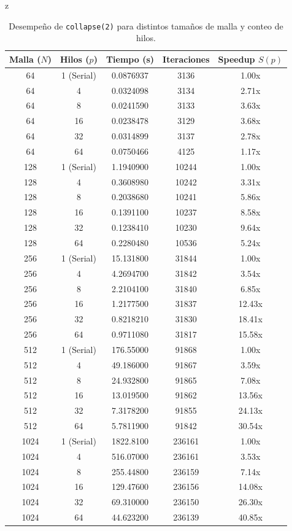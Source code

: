 z\documentclass[11pt,a4paper]{article}
\begin{document}
\begin{table}[H]
\centering
\renewcommand{\arraystretch}{1.2}
\small
\begin{tabular}{|c|c|c|c|c|}
\hline
\textbf{Malla ($N$)} & \textbf{Hilos ($p$)} & \textbf{Tiempo (s)} & \textbf{Iteraciones} & \textbf{Speedup $S(p)$} \\ \hline
64 & 1 (Serial) & 0.0876937 & 3136 & 1.00x \\ 
64 & 4 & 0.0324098 & 3134 & 2.71x \\ 
64 & 8 & 0.0241590 & 3133 & 3.63x \\ 
64 & 16 & 0.0238478 & 3129 & 3.68x \\ 
64 & 32 & 0.0314899 & 3137 & 2.78x \\ 
64 & 64 & 0.0750466 & 4125 & 1.17x \\ \hline
128 & 1 (Serial) & 1.1940900 & 10244 & 1.00x \\ 
128 & 4 & 0.3608980 & 10242 & 3.31x \\ 
128 & 8 & 0.2038680 & 10241 & 5.86x \\ 
128 & 16 & 0.1391100 & 10237 & 8.58x \\ 
128 & 32 & 0.1238410 & 10230 & 9.64x \\ 
128 & 64 & 0.2280480 & 10536 & 5.24x \\ \hline
256 & 1 (Serial) & 15.131800 & 31844 & 1.00x \\ 
256 & 4 & 4.2694700 & 31842 & 3.54x \\ 
256 & 8 & 2.2104100 & 31840 & 6.85x \\ 
256 & 16 & 1.2177500 & 31837 & 12.43x \\ 
256 & 32 & 0.8218210 & 31830 & 18.41x \\ 
256 & 64 & 0.9711080 & 31817 & 15.58x \\ \hline
512 & 1 (Serial) & 176.55000 & 91868 & 1.00x \\ 
512 & 4 & 49.186000 & 91867 & 3.59x \\ 
512 & 8 & 24.932800 & 91865 & 7.08x \\ 
512 & 16 & 13.019500 & 91862 & 13.56x \\ 
512 & 32 & 7.3178200 & 91855 & 24.13x \\ 
512 & 64 & 5.7811900 & 91842 & 30.54x \\ \hline
1024 & 1 (Serial) & 1822.8100 & 236161 & 1.00x \\ 
1024 & 4 & 516.07000 & 236161 & 3.53x \\ 
1024 & 8 & 255.44800 & 236159 & 7.14x \\ 
1024 & 16 & 129.47600 & 236156 & 14.08x \\ 
1024 & 32 & 69.310000 & 236150 & 26.30x \\ 
1024 & 64 & 44.623200 & 236139 & 40.85x \\ \hline
\end{tabular}
\caption{Desempeño de \texttt{collapse(2)} para distintos tamaños de malla y conteo de hilos.}
\label{tab:resultados_collapse}
\end{table}
\end{document}
